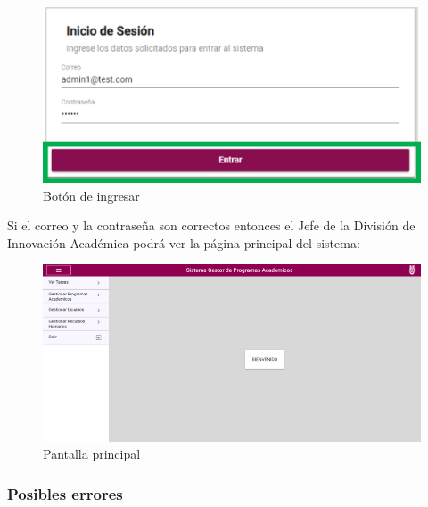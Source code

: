         \begin{figure}[H]
            \centering
            \hypertarget{BotonIng}{\includegraphics[width=0.5\linewidth]{images/SP5/BotonIngresar}}
            \caption{Botón de ingresar}
        \end{figure}

        Si el correo y la contraseña son correctos entonces el Jefe de la División de Innovación Académica podrá ver la página principal del sistema:

        \begin{figure}[H]
            \centering
            \hypertarget{Principal}{\includegraphics[width=0.7\linewidth]{images/SP5/Principal}}
            \caption{Pantalla principal}
        \end{figure}

        \clearpage
        \subsubsection{Posibles errores}

